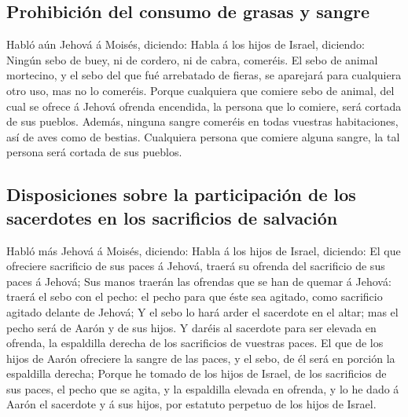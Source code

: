 \hypertarget{prohibiciuxf3n-del-consumo-de-grasas-y-sangre}{%
\subsection{Prohibición del consumo de grasas y
sangre}\label{prohibiciuxf3n-del-consumo-de-grasas-y-sangre}}

 Habló aún Jehová á Moisés, diciendo: 
Habla á los hijos de Israel, diciendo: Ningún sebo de buey, ni de
cordero, ni de cabra, comeréis.  El sebo de animal
mortecino, y el sebo del que fué arrebatado de fieras, se aparejará para
cualquiera otro uso, mas no lo comeréis.  Porque
cualquiera que comiere sebo de animal, del cual se ofrece á Jehová
ofrenda encendida, la persona que lo comiere, será cortada de sus
pueblos.  Además, ninguna sangre comeréis en todas
vuestras habitaciones, así de aves como de bestias. 
Cualquiera persona que comiere alguna sangre, la tal persona será
cortada de sus pueblos.

\hypertarget{disposiciones-sobre-la-participaciuxf3n-de-los-sacerdotes-en-los-sacrificios-de-salvaciuxf3n}{%
\subsection{Disposiciones sobre la participación de los sacerdotes en
los sacrificios de
salvación}\label{disposiciones-sobre-la-participaciuxf3n-de-los-sacerdotes-en-los-sacrificios-de-salvaciuxf3n}}

 Habló más Jehová á Moisés, diciendo: 
Habla á los hijos de Israel, diciendo: El que ofreciere sacrificio de
sus paces á Jehová, traerá su ofrenda del sacrificio de sus paces á
Jehová;  Sus manos traerán las ofrendas que se han de
quemar á Jehová: traerá el sebo con el pecho: el pecho para que éste sea
agitado, como sacrificio agitado delante de Jehová;  Y el
sebo lo hará arder el sacerdote en el altar; mas el pecho será de Aarón
y de sus hijos.  Y daréis al sacerdote para ser elevada
en ofrenda, la espaldilla derecha de los sacrificios de vuestras paces.
 El que de los hijos de Aarón ofreciere la sangre de las
paces, y el sebo, de él será en porción la espaldilla derecha;
 Porque he tomado de los hijos de Israel, de los
sacrificios de sus paces, el pecho que se agita, y la espaldilla elevada
en ofrenda, y lo he dado á Aarón el sacerdote y á sus hijos, por
estatuto perpetuo de los hijos de Israel.

